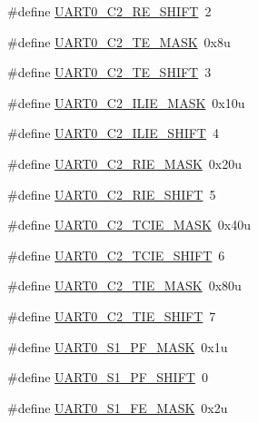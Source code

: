 \begin{DoxyCompactItemize}
\#define \hyperlink{group___u_a_r_t0___register___masks_ga9b0dc4fdd0de7040c2aa8746f9b0465e}{U\+A\+R\+T0\+\_\+\+C2\+\_\+\+R\+E\+\_\+\+S\+H\+I\+FT}~2
\item 
\#define \hyperlink{group___u_a_r_t0___register___masks_ga78c914234e9656aaa12582b408a31e64}{U\+A\+R\+T0\+\_\+\+C2\+\_\+\+T\+E\+\_\+\+M\+A\+SK}~0x8u
\item 
\#define \hyperlink{group___u_a_r_t0___register___masks_gadde2643c4aa03640ab1cf95ba8e07176}{U\+A\+R\+T0\+\_\+\+C2\+\_\+\+T\+E\+\_\+\+S\+H\+I\+FT}~3
\item 
\#define \hyperlink{group___u_a_r_t0___register___masks_ga10be4cac887b9aa3c11bbfef25808578}{U\+A\+R\+T0\+\_\+\+C2\+\_\+\+I\+L\+I\+E\+\_\+\+M\+A\+SK}~0x10u
\item 
\#define \hyperlink{group___u_a_r_t0___register___masks_ga4ab02fff3512ff6b92e5aecd62049c39}{U\+A\+R\+T0\+\_\+\+C2\+\_\+\+I\+L\+I\+E\+\_\+\+S\+H\+I\+FT}~4
\item 
\#define \hyperlink{group___u_a_r_t0___register___masks_ga9e2ddb43bcd4b9554e0c7a6fa0402efb}{U\+A\+R\+T0\+\_\+\+C2\+\_\+\+R\+I\+E\+\_\+\+M\+A\+SK}~0x20u
\item 
\#define \hyperlink{group___u_a_r_t0___register___masks_gac718305b3ddae3fe258e2735f8a074bf}{U\+A\+R\+T0\+\_\+\+C2\+\_\+\+R\+I\+E\+\_\+\+S\+H\+I\+FT}~5
\item 
\#define \hyperlink{group___u_a_r_t0___register___masks_ga8d9362d72300e5dcee78580a773b60c9}{U\+A\+R\+T0\+\_\+\+C2\+\_\+\+T\+C\+I\+E\+\_\+\+M\+A\+SK}~0x40u
\item 
\#define \hyperlink{group___u_a_r_t0___register___masks_ga019da6a7871d38f10460ea7ff32b54cc}{U\+A\+R\+T0\+\_\+\+C2\+\_\+\+T\+C\+I\+E\+\_\+\+S\+H\+I\+FT}~6
\item 
\#define \hyperlink{group___u_a_r_t0___register___masks_ga57c06364890b354bb04a5f968fc95c42}{U\+A\+R\+T0\+\_\+\+C2\+\_\+\+T\+I\+E\+\_\+\+M\+A\+SK}~0x80u
\item 
\#define \hyperlink{group___u_a_r_t0___register___masks_ga3d54c6b6f2942f117b23a3dd9b53ec2e}{U\+A\+R\+T0\+\_\+\+C2\+\_\+\+T\+I\+E\+\_\+\+S\+H\+I\+FT}~7
\item 
\#define \hyperlink{group___u_a_r_t0___register___masks_gaec8a65a2e60f3455e64b085accacb3ef}{U\+A\+R\+T0\+\_\+\+S1\+\_\+\+P\+F\+\_\+\+M\+A\+SK}~0x1u
\item 
\#define \hyperlink{group___u_a_r_t0___register___masks_ga28bf9a70a8a7b24b889512625d6df39d}{U\+A\+R\+T0\+\_\+\+S1\+\_\+\+P\+F\+\_\+\+S\+H\+I\+FT}~0
\item 
\#define \hyperlink{group___u_a_r_t0___register___masks_ga1c5be37bf4810fa33dc4a55ff08bb330}{U\+A\+R\+T0\+\_\+\+S1\+\_\+\+F\+E\+\_\+\+M\+A\+SK}~0x2u

\end{DoxyCompactItemize}
